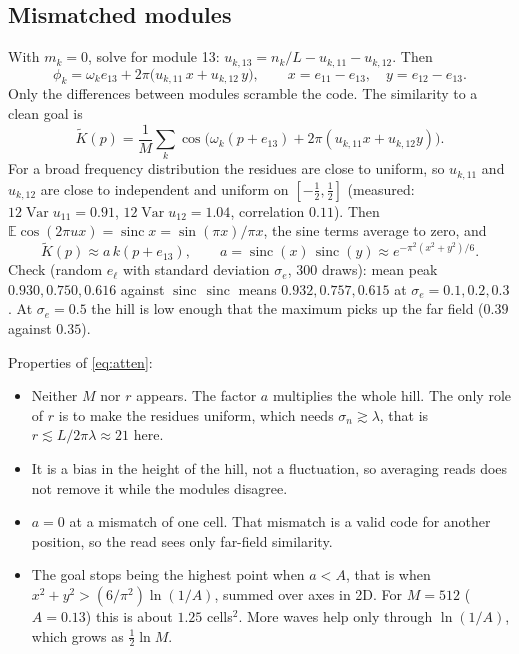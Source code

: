 \documentclass[11pt]{article}
\newcommand{\E}{\mathbb{E}}
\newcommand{\Var}{\operatorname{Var}}
\newcommand{\sinc}{\operatorname{sinc}}
\begin{document}
\subsection{Mismatched modules}

With $m_k = 0$, solve for module 13: $u_{k,13} = n_k/L - u_{k,11} - u_{k,12}$. Then
\begin{equation}
  \phi_k = \omega_k e_{13} + 2\pi\bigl(u_{k,11}\,x + u_{k,12}\,y\bigr),
  \qquad x = e_{11} - e_{13}, \quad y = e_{12} - e_{13} .
\end{equation}
Only the differences between modules scramble the code. The similarity to a clean goal is
\begin{equation}
  \tilde K(p) = \frac{1}{M}\sum_k \cos\bigl(\omega_k(p + e_{13}) + 2\pi(u_{k,11}x + u_{k,12}y)\bigr).
\end{equation}
For a broad frequency distribution the residues are close to uniform, so $u_{k,11}$ and $u_{k,12}$
are close to independent and uniform on $[-\tfrac12, \tfrac12]$ (measured: $12\Var u_{11} = 0.91$,
$12\Var u_{12} = 1.04$, correlation $0.11$). Then $\E\cos(2\pi u x) = \sinc x = \sin(\pi x)/\pi x$,
the sine terms average to zero, and
\begin{equation}
  \tilde K(p) \approx a\,k(p + e_{13}), \qquad
  a = \sinc(x)\,\sinc(y) \approx e^{-\pi^2(x^2 + y^2)/6} .
  \label{eq:atten}
\end{equation}
Check (random $e_\ell$ with standard deviation $\sigma_e$, 300 draws): mean peak $0.930, 0.750,
0.616$ against $\sinc\,\sinc$ means $0.932, 0.757, 0.615$ at $\sigma_e = 0.1, 0.2, 0.3$. At
$\sigma_e = 0.5$ the hill is low enough that the maximum picks up the far field ($0.39$ against
$0.35$).

Properties of \eqref{eq:atten}:
\begin{itemize}
  \item Neither $M$ nor $r$ appears. The factor $a$ multiplies the whole hill. The only role of
  $r$ is to make the residues uniform, which needs $\sigma_n \gtrsim \lambda$, that is
  $r \lesssim L/2\pi\lambda \approx 21$ here.
  \item It is a bias in the height of the hill, not a fluctuation, so averaging reads does not
  remove it while the modules disagree.
  \item $a = 0$ at a mismatch of one cell. That mismatch is a valid code for another position, so
  the read sees only far-field similarity.
  \item The goal stops being the highest point when $a < A$, that is when
  $x^2 + y^2 > (6/\pi^2)\ln(1/A)$, summed over axes in 2D. For $M = 512$ ($A = 0.13$) this is
  about $1.25$ cells$^2$. More waves help only through $\ln(1/A)$, which grows as
  $\tfrac12\ln M$.
\end{itemize}
\end{document}

